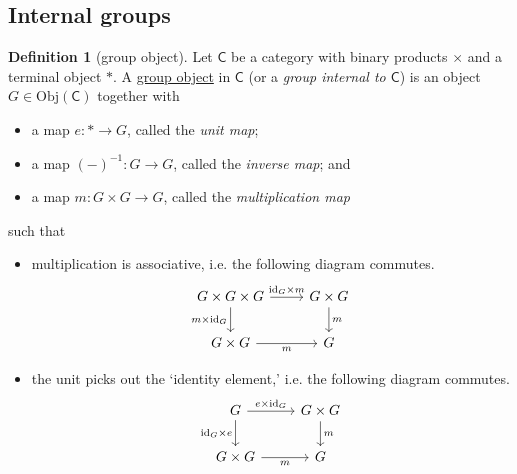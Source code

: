 \documentclass[a4paper,10pt]{scrreprt}
\newcommand{\defn}[1]{\ul{#1}}
\newcommand{\Obj}{\mathrm{Obj}}
\theoremstyle{definition}
\newtheorem{definition}{Definition}[section]
\theoremstyle{plain}
\theoremstyle{remark}
\begin{document}
\subsection{Internal groups}
\begin{definition}[group object]
  \label{def:groupobject}
  Let $\mathsf{C}$ be a category with binary products $\times$ and a terminal object $*$. A \defn{group object} in $\mathsf{C}$ (or a \emph{group internal to $\mathsf{C}$}) is an object $G \in \Obj(\mathsf{C})$ together with 
  \begin{itemize}
    \item a map $e\colon * \to G$, called the \emph{unit map};

    \item a map $(-)^{-1}\colon G \to G$, called the \emph{inverse map}; and

    \item a map $m\colon G \times G \to G$, called the \emph{multiplication map}
  \end{itemize}
  such that 
  \begin{itemize}
    \item multiplication is associative, i.e. the following diagram commutes.
      \begin{equation*}
        \begin{tikzcd}
          G \times G \times G
          \arrow[r, "\mathrm{id}_{G} \times m"]
          \arrow[d, swap, "m \times \mathrm{id}_{G}"]
          & G \times G
          \arrow[d, "m"]
          \\
          G \times G
          \arrow[r, swap, "m"]
          & G
        \end{tikzcd}
      \end{equation*}

    \item the unit picks out the `identity element,' i.e. the following diagram commutes.
      \begin{equation*}
        \begin{tikzcd}
          G
          \arrow[r, "e \times \mathrm{id}_{G}"]
          \arrow[d, swap, "\mathrm{id}_{G} \times e"]
          & G \times G
          \arrow[d, "m"]
          \\
          G \times G
          \arrow[r, swap, "m"]
          & G
        \end{tikzcd}
      \end{equation*}


\end{itemize}
\end{definition}
\end{document}
